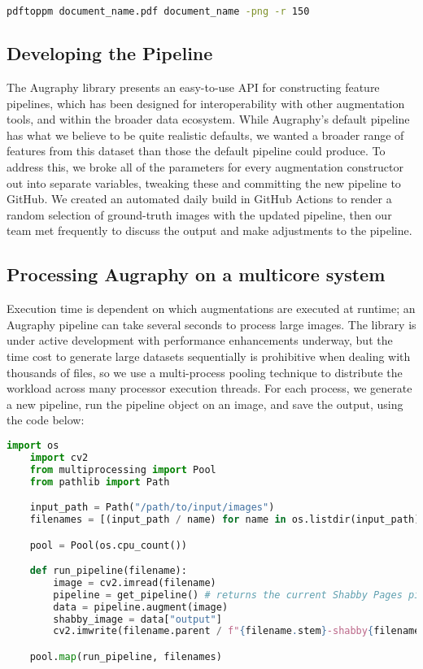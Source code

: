 \documentclass[runningheads]{llncs}
\begin{document}
\begin{lstlisting}[language=bash]
  pdftoppm document_name.pdf document_name -png -r 150
\end{lstlisting}

\subsection{Developing the Pipeline}
The Augraphy library presents an easy-to-use API for constructing feature pipelines, which has been designed for interoperability with other augmentation tools, and within the broader data ecosystem. While Augraphy's default pipeline has what we believe to be quite realistic defaults, we wanted a broader range of features from this dataset than those the default pipeline could produce. To address this, we broke all of the parameters for every augmentation constructor out into separate variables, tweaking these and committing the new pipeline to GitHub. We created an automated daily build in GitHub Actions to render a random selection of ground-truth images with the updated pipeline, then our team met frequently to discuss the output and make adjustments to the pipeline.

\subsection{Processing Augraphy on a multicore system}
Execution time is dependent on which augmentations are executed at runtime; an Augraphy pipeline can take several seconds to process large images. The library is under active development with performance enhancements underway, but the time cost to generate large datasets sequentially is prohibitive when dealing with thousands of files, so we use a multi-process pooling technique to distribute the workload across many processor execution threads. For each process, we generate a new pipeline, run the pipeline object on an image, and save the output, using the code below:

\begin{lstlisting}[language=Python]
    import os
    import cv2
    from multiprocessing import Pool
    from pathlib import Path

    input_path = Path("/path/to/input/images")
    filenames = [(input_path / name) for name in os.listdir(input_path)]

    pool = Pool(os.cpu_count())

    def run_pipeline(filename):
        image = cv2.imread(filename)
        pipeline = get_pipeline() # returns the current Shabby Pages pipeline
        data = pipeline.augment(image)
        shabby_image = data["output"]
        cv2.imwrite(filename.parent / f"{filename.stem}-shabby{filename.suffix}")

    pool.map(run_pipeline, filenames)

\end{lstlisting}
\end{document}
